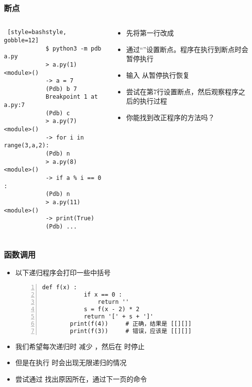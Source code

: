 \begin{CJK}{UTF8}{gbsn}
\begin{frame} [fragile]
	\frametitle{断点}
	\begin{columns}[T]
		\begin{column}[T]{.5\textwidth}
			{\small
			\begin{lstlisting} [style=bashstyle, gobble=12]
			$ python3 -m pdb a.py
			> a.py(1)<module>()
			-> a = 7
			(Pdb) b 7
			Breakpoint 1 at a.py:7
			(Pdb) c
			> a.py(7)<module>()
			-> for i in range(3,a,2):
			(Pdb) n
			> a.py(8)<module>()
			-> if a % i == 0 :
			(Pdb) n
			> a.py(11)<module>()
			-> print(True)
			(Pdb) ...
			\end{lstlisting}
			}
		\end{column}
		\begin{column}[T]{.5\textwidth}
			\linespread{1.5}
			\begin{itemize}
			\item 先将第一行改成 
			\item 通过``''设置断点。程序在执行到断点时会暂停执行
			\item 输入  从暂停执行恢复
			\item 尝试在第7行设置断点，然后观察程序之后的执行过程
			\item 你能找到改正程序的方法吗？
			\end{itemize}
		\end{column}
	\end{columns}
\end{frame}

\begin{frame} [fragile]
	\frametitle{函数调用}
	\linespread{1.25}
	\begin{itemize}
	\item 以下递归程序会打印一些中括号
		{\small
		\begin{lstlisting}[style=pythonstyle, gobble=8, frame=single, 
							numbers=left, numberstyle=\ttfamily, texcl]
		def f(x) :
			if x == 0 :
				return ''
			s = f(x - 2) * 2
			return '[' + s + ']'
		print(f(4))		# 正确，结果是 [[][]]
		print(f(3))		# 错误，应该是 [[][]]
		\end{lstlisting}
		}
	\item 我们希望每次递归时  减少  ，然后在
		 时停止
	\item 但是在执行  时会出现无限递归的情况
	\item 尝试通过  找出原因所在，通过下一页的命令
	\end{itemize}
\end{frame}


\end{CJK}
